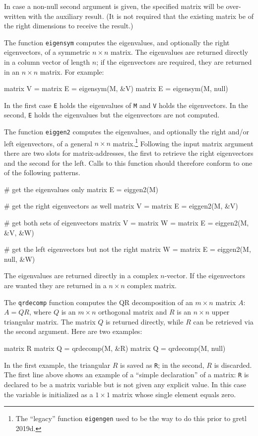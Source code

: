 In case a non-null second argument is given, the specified matrix will
be over-written with the auxiliary result.  (It is not required that
the existing matrix be of the right dimensions to receive the result.)

The function \texttt{eigensym} computes the eigenvalues, and
optionally the right eigenvectors, of a symmetric $n \times n$ matrix.
The eigenvalues are returned directly in a column vector of length
$n$; if the eigenvectors are required, they are returned in an $n
\times n$ matrix.  For example:
%
\begin{code}
matrix V = {}
matrix E = eigensym(M, &V)
matrix E = eigensym(M, null)
\end{code}
%
In the first case \texttt{E} holds the eigenvalues of \texttt{M} and
\texttt{V} holds the eigenvectors.  In the second, \texttt{E} holds
the eigenvalues but the eigenvectors are not computed.

The function \texttt{eiggen2} computes the eigenvalues, and optionally
the right and/or left eigenvectors, of a general $n \times n$
matrix.\footnote{The ``legacy'' function \texttt{eigengen} used to be
  the way to do this prior to gretl 2019d.} Following the input matrix
argument there are two slots for matrix-addresses, the first to
retrieve the right eigenvectors and the second for the left.  Calls to
this function should therefore conform to one of the following
patterns.
\begin{code}
# get the eigenvalues only
matrix E = eiggen2(M)

# get the right eigenvectors as well
matrix V = {}
matrix E = eiggen2(M, &V)

# get both sets of eigenvectors
matrix V = {}
matrix W = {}
matrix E = eiggen2(M, &V, &W)

# get the left eigenvectors but not the right
matrix W = {}
matrix E = eiggen2(M, null, &W)
\end{code}

The eigenvalues are returned directly in a complex $n$-vector. If the
eigenvectors are wanted they are returned in a $n \times n$ complex
matrix.

The \texttt{qrdecomp} function computes the QR decomposition of an $m
\times n$ matrix $A$: $A = QR$, where $Q$ is an $m \times n$
orthogonal matrix and $R$ is an $n \times n$ upper triangular matrix.
The matrix $Q$ is returned directly, while $R$ can be retrieved via
the second argument.  Here are two examples:
%
\begin{code}
matrix R
matrix Q = qrdecomp(M, &R)
matrix Q = qrdecomp(M, null)
\end{code}
%
In the first example, the triangular $R$ is saved as \texttt{R}; in
the second, $R$ is discarded.  The first line above shows an example
of a ``simple declaration'' of a matrix: \texttt{R} is
declared to be a matrix variable but is not given any explicit value.
In this case the variable is initialized as a $1\times 1$ matrix whose
single element equals zero.

